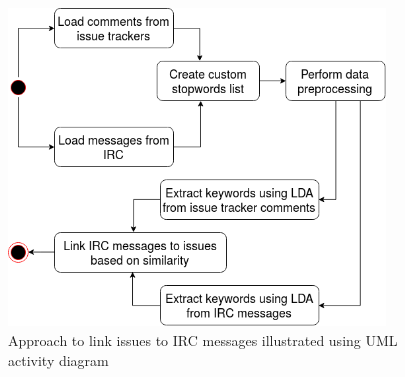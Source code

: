 \documentclass[a4paper,12pt,twoside]{report}
\begin{document}
\begin{figure}[h] %
    \centering
    \includegraphics[width=10cm]{topic-linking}
    \caption{Approach to link issues to \acs{IRC} messages illustrated using UML activity diagram}
    \label{fig:topiclinkingClass}
\end{figure}
\end{document}
